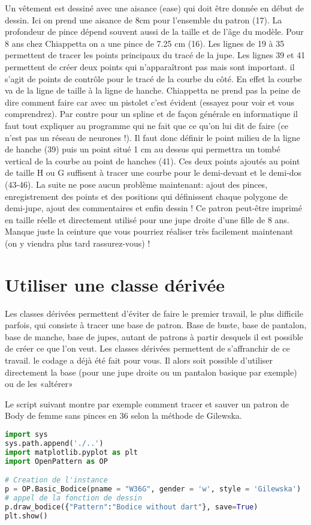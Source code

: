 \documentclass[10pt,a4paper,twoside]{report}
\begin{document}
Un vêtement est dessiné avec une aisance (ease) qui doit être donnée en début de dessin. Ici on prend une aisance de 8cm pour l'ensemble du patron (17). La profondeur de pince dépend souvent aussi de la taille et de l'âge du modèle. Pour 8 ans chez Chiappetta \cite{Chiappetta1999} on a une pince de 7.25 cm (16). Les lignes de 19 à 35 permettent de tracer les points principaux du tracé de la jupe. Les lignes 39 et 41 permettent de créer deux points qui n'apparaîtront pas mais sont important. il s'agit de points de contrôle pour le tracé de la courbe du côté. En effet la courbe va de la ligne de taille à la ligne de hanche. Chiappetta ne  prend pas la peine de dire comment faire car avec un pistolet c'est évident (essayez pour voir et vous comprendrez). Par contre pour un spline et de façon générale en informatique il faut tout expliquer au programme qui ne fait que ce qu'on lui dit de faire (ce n'est pas un réseau de neurones !). Il faut donc définir le point milieu de la ligne de hanche (39) puis un point situé 1 cm au dessus qui permettra un tombé vertical de la courbe au point de hanches (41). Ces deux points ajoutés au point de taille H ou G suffisent à tracer une courbe pour le demi-devant et le demi-dos (43-46). La suite ne pose aucun problème maintenant: ajout des pinces, enregistrement des points et des positions qui définissent chaque polygone de demi-jupe, ajout des commentaires  et enfin dessin ! Ce patron peut-être imprimé en taille réelle et directement utilisé pour une jupe droite d'une fille de 8 ans. Manque juste la ceinture  que vous pourriez réaliser très facilement maintenant (on y viendra plus tard rassurez-vous) !


\section{Utiliser une classe dérivée}

Les classes dérivées permettent d'éviter de faire le premier travail, le plus difficile parfois, qui consiste à tracer une base de patron. Base de buste, base de pantalon, base de manche, base de jupes, autant de patrons à partir desquels il est possible de créer ce que l'on veut. Les classes dérivées permettent de s'affranchir de ce travail. le codage a déjà été fait pour vous. Il alors soit possible d'utiliser directement la base (pour une jupe droite ou un pantalon basique par exemple) ou de les «altérer»

Le script suivant montre par exemple comment tracer et sauver un patron de Body de femme sans pinces en 36 selon la méthode de Gilewska.
\begin{lstlisting}[language=python]
import sys
sys.path.append('./..')
import matplotlib.pyplot as plt
import OpenPattern as OP

# Creation de l'instance
p = OP.Basic_Bodice(pname = "W36G", gender = 'w', style = 'Gilewska')
# appel de la fonction de dessin
p.draw_bodice({"Pattern":"Bodice without dart"}, save=True)
plt.show()
\end{lstlisting}
\end{document}
